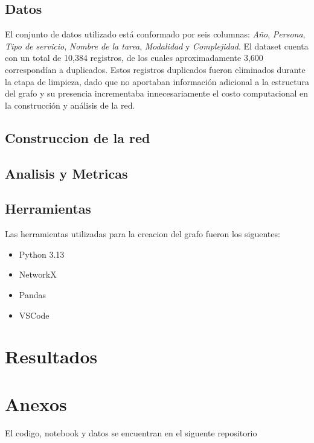 \documentclass[twocolumn]{article}
\begin{document}
\subsection{Datos}
El conjunto de datos utilizado está conformado por seis columnas: \textit{Año}, \textit{Persona}, \textit{Tipo de servicio}, \textit{Nombre de la tarea}, \textit{Modalidad} y \textit{Complejidad}. 
El dataset cuenta con un total de 10,384 registros, de los cuales aproximadamente 3,600 correspondían a duplicados. 
Estos registros duplicados fueron eliminados durante la etapa de limpieza, dado que no aportaban información adicional a la estructura del grafo y su presencia incrementaba innecesariamente el costo computacional en la construcción y análisis de la red.

\subsection{Construccion de la red}
\blindtext[1]

\subsection{Analisis y Metricas}
\blindtext[1]

\subsection{Herramientas}
Las herramientas utilizadas para la creacion del grafo fueron los siguentes:
\begin{itemize}
    \item Python 3.13
    \item NetworkX
    \item Pandas
    \item VSCode
\end{itemize}

\section{Resultados}
\blindtext[4]

\printbibliography

\section{Anexos}
El codigo, notebook y datos se encuentran en el siguente repositorio \parencite{repoCodigo}
\end{document}
